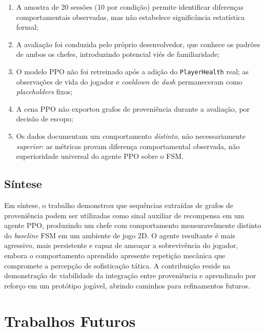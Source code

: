\begin{enumerate}
    \item A amostra de 20 sessões (10 por condição) permite identificar
          diferenças comportamentais observadas, mas não estabelece
          significância estatística formal;
    \item A avaliação foi conduzida pelo próprio desenvolvedor, que conhece
          os padrões de ambos os chefes, introduzindo potencial viés de
          familiaridade;
    \item O modelo PPO não foi retreinado após a adição do
          \texttt{PlayerHealth} real; as observações de vida do jogador e
          \textit{cooldown} de \textit{dash} permaneceram como
          \textit{placeholders} fixos;
    \item A cena PPO não exportou grafos de proveniência durante a avaliação,
          por decisão de escopo;
    \item Os dados documentam um comportamento \textit{distinto}, não
          necessariamente \textit{superior}: as métricas provam diferença
          comportamental observada, não superioridade universal do agente PPO
          sobre o FSM.
\end{enumerate}

\subsection{Síntese}
\label{subsec:sintese-discussao}

Em síntese, o trabalho demonstrou que sequências extraídas de grafos de
proveniência podem ser utilizadas como sinal auxiliar de recompensa em um
agente PPO, produzindo um chefe com comportamento mensuravelmente distinto
do \textit{baseline} FSM em um ambiente de jogo 2D. O agente resultante é
mais agressivo, mais persistente e capaz de ameaçar a sobrevivência do
jogador, embora o comportamento aprendido apresente repetição mecânica que
compromete a percepção de sofisticação tática. A contribuição reside na
demonstração de viabilidade da integração entre proveniência e aprendizado
por reforço em um protótipo jogável, abrindo caminhos para refinamentos
futuros.

\section{Trabalhos Futuros}
\label{sec:trabalhos-futuros}


